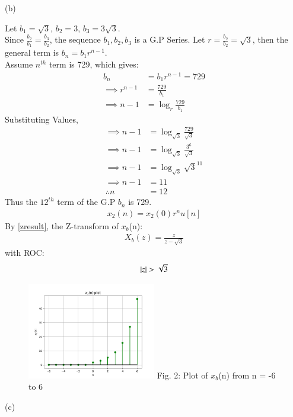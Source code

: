 \documentclass[journal,12pt,twocolumn]{IEEEtran}
\theoremstyle{remark}
\begin{document}
\newpage
(b) 



Let $b_1 = \sqrt{3}$, $b_2 = 3$, $b_3 = 3\sqrt{3}$.\\
Since $\frac{b_2}{b_1} = \frac{b_3}{b_2}$, the sequence $b_1, b_2, b_3$ is a G.P Series.
Let $r = \frac{b_2}{b_2} = \sqrt{3}$, then the general term is $b_n = b_1 r^{n-1}$.\\
Assume $n^{th}$ term is 729, which gives: 
\begin{align}
    b_n &= b_1 r^{n-1} = 729\\
    \implies r^{n-1} &= \frac{729}{b_1}\\
    \implies n - 1 &= \log_{r}{\frac{729}{b_1}}
\end{align}
Substituting Values,
\begin{align}
    \implies n - 1 &= \log_{\sqrt{3}}{\frac{729}{\sqrt{3}}}\\
    \implies n - 1 &= \log_{\sqrt{3}}{\frac{3^6}{\sqrt{3}}}\\
    \implies n - 1 &= \log_{\sqrt{3}}{\sqrt{3}^{11}}\\
    \implies n - 1 &= 11\\
    \therefore n &= 12
\end{align}
Thus the $12^{th}$ term of the G.P $b_n$ is 729.
\begin{align}  x_2(n) = x_2(0)r^nu[n]  \end{align}
By \ref{zresult}, the Z-transform of $x_b$(n):
\begin{align} X_b(z) = \frac{z}{z - \sqrt{3}} \end{align}
with ROC: \[ \left\vert z\right\vert > \sqrt{3} \]
\begin{figure}[h!]
    \centering
    \includegraphics[width=0.5\textwidth]{figs/b.png}
    Fig. 2: Plot of $x_b$(n) from n = -6 to 6
    \label{fig:img2}
\end{figure}

(c) 


\end{document}
